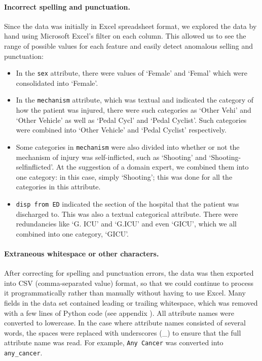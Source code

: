 \paragraph{Incorrect spelling and punctuation.}
Since the data was initially in Excel spreadsheet format, we explored the data
by hand using Microsoft Excel's filter on each column. This allowed us to see
the range of possible values for each feature and easily detect anomalous
selling and punctuation:
\begin{itemize}
  \item In the \texttt{sex} attribute, there were values of `Female' and
  `Femal' which were consolidated into `Female'.
  \item In the \texttt{mechanism} attribute, which was textual and indicated
  the category of how the patient was injured, there were such categories as
  `Other Vehi' and `Other Vehicle' as well as `Pedal Cycl' and `Pedal Cyclist'.
  Such categories were combined into `Other Vehicle' and `Pedal Cyclist'
  respectively.
  \item Some categories in \texttt{mechanism} were also divided into whether or
  not the mechanism of injury was self-inflicted, such as `Shooting' and
  `Shooting-selfinflicted'. At the suggestion of a domain expert, we combined
  them into one category: in this case, simply
  `Shooting'; this was done for all the categories in this attribute.
  \item \texttt{disp from ED} indicated the section of the hospital that the
  patient was discharged to. This was also a textual categorical attribute.
  There were redundancies like `G. ICU' and `G.ICU' and even `GICU', which we
  all combined into one category, `GICU'.
\end{itemize}

\paragraph{Extraneous whitespace or other characters.}
After correcting for spelling and punctuation errors,
the data was then exported into CSV (comma-separated value) format, so that
we could continue to process it programmatically rather than manually without
having to use Excel. Many
fields in the data set contained leading or trailing whitespace, which was
removed with a few lines of Python code (see appendix ). All attribute names were converted to lowercase. In the case
where attribute names consisted of several words, the spaces were replaced
with underscores (\_) to ensure that the full attribute name was read.
For example, \texttt{Any Cancer} was converted into \texttt{any\_cancer}.

